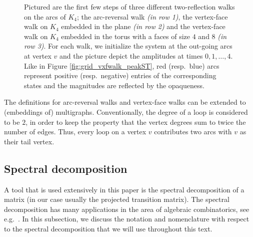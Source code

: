 \documentclass{article}
\numberwithin{equation}{section}
\begin{document}
\begin{figure}
\caption{Pictured are the first few steps of three different two-reflection walks on the arcs of $K_4$; the arc-reversal walk \emph{(in row 1)}, the vertex-face walk on $K_4$ embedded in the plane \emph{(in row 2)} and the vertex-face walk on $K_4$ embedded in the torus with a faces of size $4$ and $8$ \emph{(in row 3)}. For each walk, we initialize the system at the out-going arcs at vertex $v$ and the picture depict the amplitudes at times $0,1,\ldots, 4$. Like in Figure \ref{fig:grid_vxfwalk_peakST}, red (resp.\ blue) arcs represent positive (resp.\ negative) entries of the corresponding states and the magnitudes are reflected by the opaqueness.\label{fig:K4_2reflectionwalks}}
\end{figure}

The definitions for arc-reversal walks and vertex-face walks can be extended to (embeddings of) multigraphs. Conventionally, the degree of a loop is considered to be $2$, in order to keep the property that the vertex degrees sum to twice the number of edges. Thus, every loop on a vertex $v$ contributes two arcs with $v$ as their tail vertex.

\subsection{Spectral decomposition}
\label{sec:prelim-spectral_decomposition}

A tool that is used extensively in this paper is the spectral decomposition of a matrix (in our case usually the projected transition matrix). The spectral decomposition has many applications in the area of algebraic combinatorics, see e.g.\ \cite{GodRoy2001}. In this subsection, we discuss the notation and nomenclature with respect to the spectral decomposition that we will use throughout this text.
\end{document}
